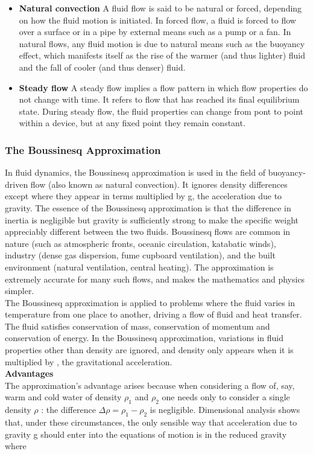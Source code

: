 \begin{itemize}
	\item \textbf{Natural convection}
	A fluid flow is said to be natural or forced, depending on how the fluid motion is initiated. In forced flow, a fluid is forced to flow over a surface or in a pipe by external means such as a pump or a fan. In natural flows, any fluid motion is due to natural means such as the buoyancy effect, which manifests itself as the rise of the warmer (and thus lighter) fluid and the fall of cooler (and thus denser) fluid.
	
	\item  \textbf{Steady flow}
	A steady flow implies a flow pattern in which flow properties do not change with time. It refers to flow that has reached its final equilibrium state. During steady flow, the fluid properties can change from pont to point within a device, but at any fixed point they remain constant.           
	
\end{itemize}
\subsubsection{The Boussinesq Approximation }
In fluid dynamics, the Boussinesq approximation is used in the field of buoyancy-driven flow (also known as natural convection). It ignores density differences except where they appear in terms multiplied by g, the acceleration due to gravity. The essence of the Boussinesq approximation is that the difference in inertia is negligible but gravity is sufficiently strong to make the specific weight appreciably different between the two fluids.
Boussinesq flows are common in nature (such as atmospheric fronts, oceanic circulation, katabatic winds), industry (dense gas dispersion, fume cupboard ventilation), and the built environment (natural ventilation, central heating). The approximation is extremely accurate for many such flows, and makes the mathematics and physics simpler.
\\
The Boussinesq approximation is applied to problems where the fluid varies in temperature from one place to another, driving a flow of fluid and heat transfer. The fluid satisfies conservation of mass, conservation of momentum and conservation of energy. In the Boussinesq approximation, variations in fluid properties other than density   are ignored, and density only appears when it is multiplied by  , the gravitational acceleration.
\\
\textbf{Advantages}
\\
The approximation's advantage arises because when considering a flow of, say, warm and cold water of density $ \rho_1 $ and $ \rho_2 $  one needs only to consider a single density $ \rho$ : the difference $\Delta\rho = \rho_1 - \rho_2 $  is negligible. Dimensional analysis shows that, under these circumstances, the only sensible way that acceleration due to gravity g should enter into the equations of motion is in the reduced gravity   where
	
